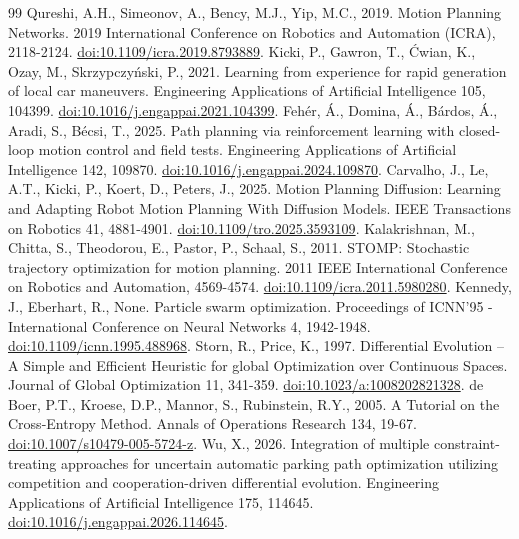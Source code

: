 \begin{thebibliography}{99}
 Qureshi, A.H., Simeonov, A., Bency, M.J., Yip, M.C., 2019. Motion Planning Networks. 2019 International Conference on Robotics and Automation (ICRA), 2118-2124. \href{https://doi.org/10.1109/icra.2019.8793889}{doi:10.1109/icra.2019.8793889}.
 Kicki, P., Gawron, T., \'{C}wian, K., Ozay, M., Skrzypczy\'{n}ski, P., 2021. Learning from experience for rapid generation of local car maneuvers. Engineering Applications of Artificial Intelligence 105, 104399. \href{https://doi.org/10.1016/j.engappai.2021.104399}{doi:10.1016/j.engappai.2021.104399}.
 Fehér, Á., Domina, Á., Bárdos, Á., Aradi, S., Bécsi, T., 2025. Path planning via reinforcement learning with closed-loop motion control and field tests. Engineering Applications of Artificial Intelligence 142, 109870. \href{https://doi.org/10.1016/j.engappai.2024.109870}{doi:10.1016/j.engappai.2024.109870}.
 Carvalho, J., Le, A.T., Kicki, P., Koert, D., Peters, J., 2025. Motion Planning Diffusion: Learning and Adapting Robot Motion Planning With Diffusion Models. IEEE Transactions on Robotics 41, 4881-4901. \href{https://doi.org/10.1109/tro.2025.3593109}{doi:10.1109/tro.2025.3593109}.
 Kalakrishnan, M., Chitta, S., Theodorou, E., Pastor, P., Schaal, S., 2011. STOMP: Stochastic trajectory optimization for motion planning. 2011 IEEE International Conference on Robotics and Automation, 4569-4574. \href{https://doi.org/10.1109/icra.2011.5980280}{doi:10.1109/icra.2011.5980280}.
 Kennedy, J., Eberhart, R., None. Particle swarm optimization. Proceedings of ICNN'95 - International Conference on Neural Networks 4, 1942-1948. \href{https://doi.org/10.1109/icnn.1995.488968}{doi:10.1109/icnn.1995.488968}.
 Storn, R., Price, K., 1997. Differential Evolution -- A Simple and Efficient Heuristic for global Optimization over Continuous Spaces. Journal of Global Optimization 11, 341-359. \href{https://doi.org/10.1023/a:1008202821328}{doi:10.1023/a:1008202821328}.
 de Boer, P.T., Kroese, D.P., Mannor, S., Rubinstein, R.Y., 2005. A Tutorial on the Cross-Entropy Method. Annals of Operations Research 134, 19-67. \href{https://doi.org/10.1007/s10479-005-5724-z}{doi:10.1007/s10479-005-5724-z}.
 Wu, X., 2026. Integration of multiple constraint-treating approaches for uncertain automatic parking path optimization utilizing competition and cooperation-driven differential evolution. Engineering Applications of Artificial Intelligence 175, 114645. \href{https://doi.org/10.1016/j.engappai.2026.114645}{doi:10.1016/j.engappai.2026.114645}.

\end{thebibliography}

